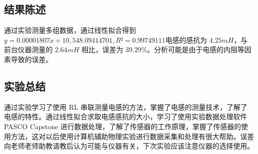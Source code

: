 \documentclass[a4paper]{../phyreport}
\begin{document}
\subsection{结果陈述}
通过实验测量多组数据，通过线性拟合得到$y = 0.00001807 x + 10,548.09414701,R² = 0.99749111$电感的感抗为 $4.25mH$，与前台仪器测量的 $2.64mH$ 相比，误差为 $39.29\%$。分析可能是由于电感的内阻等因素导致的误差。
\subsection{实验总结}
通过实验学习了使用 RL 串联测量电感的方法，掌握了电感的测量技术，了解了电感的特性。通过线性拟合求取电感感抗的大小，学习了使用实验数据处理软件 PASCO Capstone 进行数据处理，了解了传感器的工作原理，掌握了传感器的使用方法，这对以后使用计算机辅助物理实验进行数据采集和处理有很大帮助。误差向老师老师助教请教后认为可能与仪器有关，下次实验应该注意仪器的选择使用。

\endBox
\end{document}
